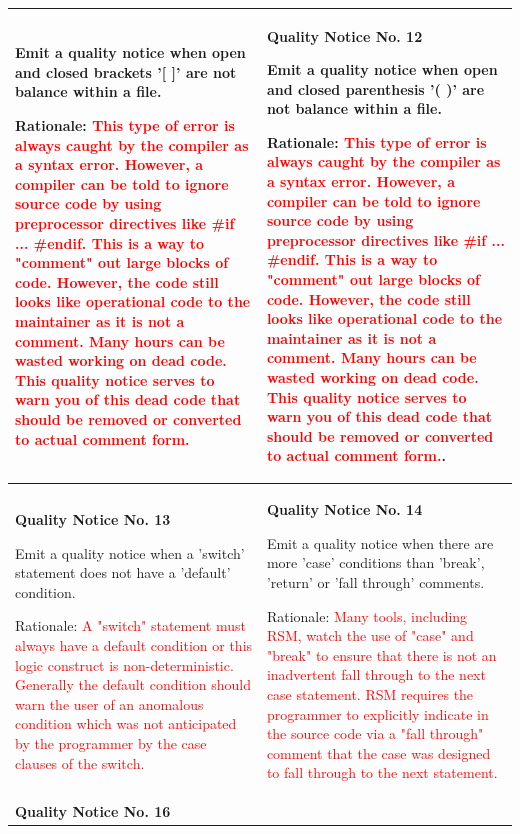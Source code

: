 {\begin{longtable}{||p{}|p{}||}
Emit a quality notice when open and closed brackets '[ ]' are not balance within a file.

Rationale:  \textcolor{red}{This type of error is always caught by the compiler as a syntax error.  However, a compiler can be told to ignore source code by using preprocessor directives like \#if ... \#endif.  This is a way to "comment" out large blocks of code.  However, the code still looks like operational code to the maintainer as it is not a comment.  Many hours can be wasted working on dead code.  This quality notice serves to warn you of this dead code that should be removed or converted to actual comment form.}
 & \textbf{Quality Notice No. 12}
 
Emit a quality notice when open and closed parenthesis '( )' are not balance within a file.

Rationale:  \textcolor{red}{This type of error is always caught by the compiler as a syntax error.  However, a compiler can be told to ignore source code by using preprocessor directives like \#if ... \#endif.  This is a way to "comment" out large blocks of code.  However, the code still looks like operational code to the maintainer as it is not a comment.  Many hours can be wasted working on dead code.  This quality notice serves to warn you of this dead code that should be removed or converted to actual comment form.}.
    \\
    \hline \textbf{Quality Notice No. 13}
    
Emit a quality notice when a 'switch' statement does not have a 'default' condition.

Rationale:  \textcolor{red}{A "switch" statement must always have a default condition or this logic construct is non-deterministic.  Generally the default condition should warn the user of an anomalous condition which was not anticipated by the programmer by the case clauses of the switch.}
 & \textbf{Quality Notice No. 14}
 
Emit a quality notice when there are more 'case' conditions than 'break', 'return' or 'fall through' comments.

Rationale:  \textcolor{red}{Many tools, including RSM, watch the use of "case" and "break" to ensure that there is not an inadvertent fall through to the next case statement.  RSM requires the programmer to explicitly indicate in the source code via a "fall through" comment that the case was designed to fall through to the next statement.}
    \\
    \hline \textbf{Quality Notice No. 16}
    

\end{longtable}}
